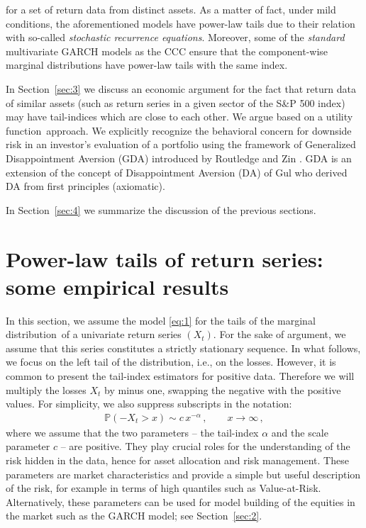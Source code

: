 \documentclass[11pt,a4]{amsart}
\newcommand{\sre}{stochastic recurrence equation}
\newcommand{\beam}{\begin{eqnarray}}
\newcommand{\eeam}{\end{eqnarray}\noindent}
\newcommand{\xto}{x\to\infty}
\newcommand{\fct}{function}
\newcommand{\ds}{distribution}
\newcommand{\seq}{sequence}
\renewcommand{\P }{{\mathbb P}}
\newcommand{\1}{{\mathbf 1}}
\begin{document}
for a set of return data from distinct assets. As a matter of fact, under mild conditions, the aforementioned models
have power-law tails due to their relation with so-called {\em \sre s}. Moreover, some of the {\em standard} multivariate 
GARCH models as the CCC ensure that the component-wise marginal \ds s have power-law tails with the same index.
\par
In Section~\ref{sec:3} we discuss an economic argument for the fact that return data of similar assets
(such as return series in a given sector of the S\&P 500 index) may have tail-indices which are close to each other.
We argue based on a  utility \fct\ approach. We explicitly recognize the behavioral
concern for downside risk in an investor's evaluation of a portfolio
using the framework of Generalized Disappointment Aversion (GDA)
introduced by Routledge and Zin \cite{routledge2010generalized}. GDA
is an extension of the concept of Disappointment Aversion (DA) of Gul \cite{gul:1991} who derived DA from first principles (axiomatic).

In Section~\ref{sec:4} we summarize the discussion of the previous
sections. 

\section{Power-law tails of return series: some empirical results}\label{sec:1}\setcounter{equation}{0}
In this section, we assume the model \eqref{eq:1} for the tails of the marginal
\ds\ of a univariate return series $(X_t)$. For the sake of argument, we assume
that this series constitutes a strictly stationary \seq . In what follows, we focus
on the left tail of the \ds , i.e., on the losses. 
However, it is common to present the tail-index estimators
for positive data. Therefore we will multiply the losses $X_t$ by
minus one, swapping the negative with the positive values.
For simplicity, we also suppress subscripts in the notation:
\beam\label{eq:1a}
\P(-X_t>x)\sim c\,x^{-\alpha}\,,\qquad \xto\,,
\eeam
where we assume that the two parameters -- the tail-index  $\alpha$ and the scale parameter
$c$ -- are positive. They play crucial roles for the understanding of the risk hidden in the data, hence 
for asset allocation and risk management. These parameters are market characteristics  and provide a simple but 
useful description of the risk, for example in terms of high quantiles such as
Value-at-Risk. Alternatively, these parameters can be
used for model building of the equities in the market such as the GARCH model; see Section~\ref{sec:2}.
\end{document}
